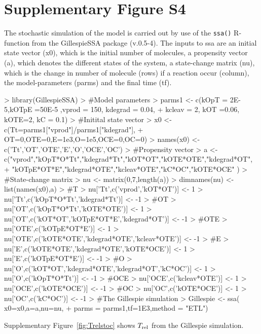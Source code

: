\documentclass[a4paper,11pt]{article}
\newcommand{\Trel}{T_{\rm{rel}}}
\begin{document}
\section{Supplementary Figure S4}
The stochastic simulation of the model is carried out by use of the \texttt{ssa()} R-function from the GillespieSSA package (v.0.5-4). The inputs to ssa are an initial state vector (x0), which is the initial number of molecules, a propensity vector (a), which denotes the different states of the system, a state-change matrix (nu), which is the change in number of molecule (rows) if a reaction occur (column), the model-parameters (parms) and the final time (tf).
\begin{Schunk}
\begin{Sinput}
> library(GillespieSSA)
> #Model parameters
> parms1 <- c(kOpT = 2E-5,kOTpE =50E-5 ,vprod = 150,  kdegrad = 0.04,		  
+               kcleav = 2, kOT =0.06, kOTE=2, kC = 0.1)
> #Initital state vector
> x0 <- c(Tt=parms1["vprod"]/parms1["kdegrad"],
+         OT=0,OTE=0,E=1e3,O=1e5,OCE=0,OC=0)
> names(x0) <- c('Tt','OT','OTE','E','O','OCE','OC')
> #Propensity vector
> a <-  c("vprod","kOpT*O*Tt","kdegrad*Tt","kOT*OT","kOTE*OTE","kdegrad*OT",
+         "kOTpE*OT*E","kdegrad*OTE","kcleav*OTE","kC*OC","kOTE*OCE" )
> #State-change matrix
> nu <- matrix(0,7,length(a))
> dimnames(nu) <- list(names(x0),a)
> #T
> nu['Tt',c('vprod','kOT*OT')] <- 1
> nu['Tt',c('kOpT*O*Tt','kdegrad*Tt')] <- -1 
> #OT
> nu['OT',c('kOpT*O*Tt','kOTE*OTE')] <- 1
> nu['OT',c('kOT*OT','kOTpE*OT*E','kdegrad*OT')] <- -1
> #OTE
> nu['OTE',c('kOTpE*OT*E')] <- 1
> nu['OTE',c('kOTE*OTE','kdegrad*OTE','kcleav*OTE')] <- -1
> #E
> nu['E',c('kOTE*OTE','kdegrad*OTE','kOTE*OCE')] <- 1
> nu['E',c('kOTpE*OT*E')] <- -1
> #O
> nu['O',c('kOT*OT','kdegrad*OTE','kdegrad*OT','kC*OC')] <- 1
> nu['O',c('kOpT*O*Tt')] <- -1
> #OCE
> nu['OCE',c('kcleav*OTE')] <- 1
> nu['OCE',c('kOTE*OCE')] <- -1
> #OC
> nu['OC',c('kOTE*OCE')] <- 1
> nu['OC',c('kC*OC')] <- -1
> #The Gillespie simulation
> Gillespie <- ssa( x0=x0,a=a,nu=nu,
+       parms = parms1,tf=1E3,method = "ETL")
\end{Sinput}
\end{Schunk}
Supplementary Figure~\ref{fig:Trelstoc} shows $\Trel$ from the Gillespie simulation.
\end{document}

